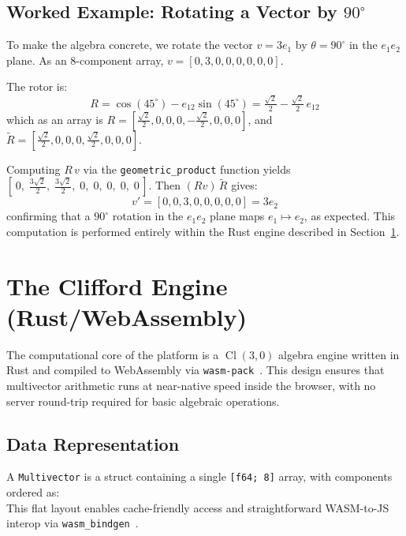 \documentclass[conference]{IEEEtran}
\begin{document}
\subsection{Worked Example: Rotating a Vector by \texorpdfstring{$90^\circ$}{90 degrees}}
\label{sec:worked_example}
To make the algebra concrete, we rotate the vector $v = 3e_1$ by $\theta = 90^\circ$ in the $e_1 e_2$ plane. As an 8-component array, $v = [0, 3, 0, 0, 0, 0, 0, 0]$.

The rotor is:
\begin{equation}
    R = \cos(45^\circ) - e_{12}\sin(45^\circ) = \tfrac{\sqrt{2}}{2} - \tfrac{\sqrt{2}}{2}\,e_{12}
\end{equation}
which as an array is $R = [\tfrac{\sqrt{2}}{2}, 0, 0, 0, -\tfrac{\sqrt{2}}{2}, 0, 0, 0]$, and $\tilde{R} = [\tfrac{\sqrt{2}}{2}, 0, 0, 0, \tfrac{\sqrt{2}}{2}, 0, 0, 0]$.

Computing $R\,v$ via the \texttt{geometric\_product} function yields $[\,0,\; \tfrac{3\sqrt{2}}{2},\; \tfrac{3\sqrt{2}}{2},\; 0,\; 0,\; 0,\; 0,\; 0\,]$. Then $(Rv)\,\tilde{R}$ gives:
\begin{equation}
    v' = [0, 0, 3, 0, 0, 0, 0, 0] = 3e_2
\end{equation}
confirming that a $90^\circ$ rotation in the $e_1 e_2$ plane maps $e_1 \mapsto e_2$, as expected. This computation is performed entirely within the Rust engine described in Section~\ref{sec:engine}.

\section{The Clifford Engine (Rust/WebAssembly)}
\label{sec:engine}

The computational core of the platform is a $\operatorname{Cl}(3,0)$ algebra engine written in Rust and compiled to WebAssembly via \texttt{wasm-pack}~\cite{b_wasm_pack}. This design ensures that multivector arithmetic runs at near-native speed inside the browser, with no server round-trip required for basic algebraic operations.

\subsection{Data Representation}
A \texttt{Multivector} is a struct containing a single \texttt{[f64; 8]} array, with components ordered as:
\begin{equation}
    [s,\; e_1,\; e_2,\; e_3,\; e_{12},\; e_{23},\; e_{31},\; e_{123}]
    \label{eq:layout}
\end{equation}
This flat layout enables cache-friendly access and straightforward WASM-to-JS interop via \texttt{wasm\_bindgen}~\cite{b_wasm_bindgen}.
\end{document}
